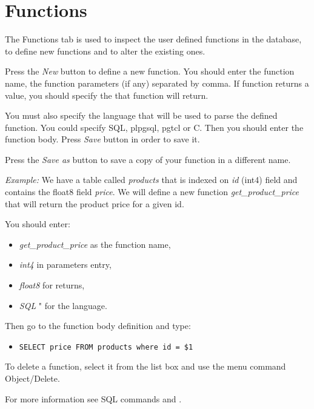 \section{Functions}
The Functions tab is used to inspect the user defined functions in the
database, to define new functions and to alter the existing ones.

Press the \emph{New} button to define a new function. You should enter the
function name, the function parameters (if any) separated by comma.
If function returns a value, you should specify the
 that function will return.

You must also specify the language that will be used to parse the defined
function. You could specify SQL, plpgsql, pgtcl or C. Then you should enter the
function body. Press \emph{Save} button in order to save it.

Press the \emph{Save as} button to save a copy of your function in a different name.

\textit{Example:}
We have a table called \emph{products} that is indexed on \emph{id} (int4) field and
contains the float8 field \emph{price}. We will define a new function 
\emph{get\_product\_price} that will return the product price for a given id.

You should enter:
\begin{itemize}
    \item \emph{get\_product\_price} as the function name,
    \item \emph{int4} in parameters entry,
    \item \emph{float8} for returns,
    \item \emph{SQL} " for the language.
\end{itemize}
Then go to the function body definition and type:
\begin{itemize}
    \item \texttt{SELECT price FROM products where id = \$1}
\end{itemize}
To delete a function, select it from the list box and use the menu command
Object/Delete.

For more information see SQL commands  and
.
